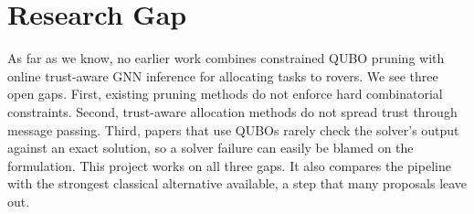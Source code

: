 \section{Research Gap}

As far as we know, no earlier work combines constrained QUBO pruning with
online trust-aware GNN inference for allocating tasks to rovers. We see three
open gaps. First, existing pruning methods do not enforce hard combinatorial
constraints. Second, trust-aware allocation methods do not spread trust through
message passing. Third, papers that use QUBOs rarely check the solver's output
against an exact solution, so a solver failure can easily be blamed on the
formulation. This project works on all three gaps. It also compares the
pipeline with the strongest classical alternative available, a step that many
proposals leave out.
